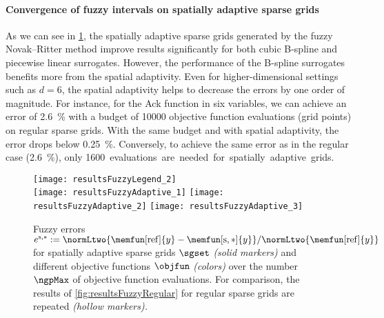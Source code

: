 \begin{algorithm}
  \caption[Fuzzy Novak--Ritter method]{%
    Fuzzy Novak--Ritter method to generate spatially adaptive sparse grids
    for the fuzzy extension principle.
    Inputs are
    the objective function $\objfun$,
    the adaptivity parameter $\gamma \in \clint{0, 1}$,
    the number of $\alpha$ segments,
    the initial sparse grid $\liset$ as a set of level-index pairs, and the
    the $d$ fuzzy intervals $\fuzzy{x}_1, \dotsc, \fuzzy{x}_d$.
    The output is the spatially adaptive sparse grid $\liset$.%
  }%
  \label{alg:fuzzyNovakRitterMethod}%
\end{algorithm}

\paragraph{Convergence of fuzzy intervals on spatially adaptive sparse grids}

As we can see in \cref{fig:resultsFuzzyAdaptive},
the spatially adaptive sparse grids generated by the fuzzy Novak--Ritter
method improve results significantly
for both cubic B-spline and piecewise linear surrogates.
However, the performance of the B-spline surrogates benefits more
from the spatial adaptivity.
Even for higher-dimensional settings such as $d = 6$,
the spatial adaptivity helps to decrease the errors by one order of magnitude.
For instance, for the Ack function in six variables,
we can achieve an error of \SI{2.6}{\percent}
with a budget of \num{10000} objective function evaluations (grid points)
on regular sparse grids.
With the same budget and with spatial adaptivity, the error drops below
\SI{0.25}{\percent}.
Conversely, to achieve the same error as in the regular case
(\SI{2.6}{\percent}),
only \SI{1600} evaluations are needed for spatially adaptive grids.

\begin{figure}
  \texttt{[image: resultsFuzzyLegend\_2]}\\[2mm]%
  \texttt{[image: resultsFuzzyAdaptive\_1]}%
  \hfill%
  \texttt{[image: resultsFuzzyAdaptive\_2]}%
  \hfill%
  \texttt{[image: resultsFuzzyAdaptive\_3]}%
  \caption[Fuzzy errors for spatially adaptive sparse grids]{%
    Fuzzy errors
    $e^{\sparse,\ast}
    := \normLtwo{\memfun[\reference]{y} - \memfun[\sparse,\ast]{y}}/
    \normLtwo{\memfun[\reference]{y}}$
    for spatially adaptive sparse grids $\sgset$ \emph{(solid markers)}
    and different objective functions $\objfun$ \emph{(colors)}
    over the number $\ngpMax$ of objective function evaluations.
    For comparison, the results of \cref{fig:resultsFuzzyRegular}
    for regular sparse grids are repeated \emph{(hollow markers).}%
  }%
  \label{fig:resultsFuzzyAdaptive}%
\end{figure}
